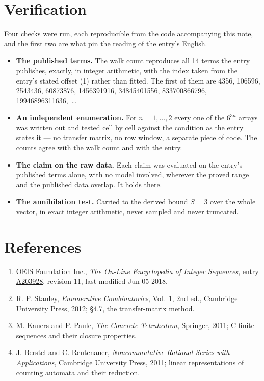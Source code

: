\documentclass[11pt]{article}
\theoremstyle{definition}
\begin{document}
\section{Verification}

Four checks were run, each reproducible from the code accompanying this note, and the first two are what pin the reading of the entry's English.

\begin{itemize}

\item {\bfseries The published terms.} The walk count reproduces all 14 terms the entry publishes, exactly, in integer arithmetic, with the index taken from the entry's stated offset (1) rather than fitted. The first of them are 4356, 106596, 2543436, 60873876, 1456391916, 34845401556, 833700866796, 19946896311636,~\dots

\item {\bfseries An independent enumeration.} For $n = 1,\dots,2$ every one of the $6^{3n}$ arrays was written out and tested cell by cell against the condition as the entry states it --- no transfer matrix, no row window, a separate piece of code. The counts agree with the walk count and with the entry.

\item {\bfseries The claim on the raw data.} Each claim was evaluated on the entry's published terms alone, with no model involved, wherever the proved range and the published data overlap. It holds there.

\item {\bfseries The annihilation test.} Carried to the derived bound $S = 3$ over the whole vector, in exact integer arithmetic, never sampled and never truncated.

\end{itemize}

\section{References}

\begin{enumerate}

\item OEIS Foundation Inc., \emph{The On-Line Encyclopedia of Integer Sequences}, entry \href{https://oeis.org/A203928}{A203928}, revision 11, last modified Jun 05 2018.

\item R. P. Stanley, \emph{Enumerative Combinatorics}, Vol.~1, 2nd ed., Cambridge University Press, 2012; \S4.7, the transfer-matrix method.

\item M. Kauers and P. Paule, \emph{The Concrete Tetrahedron}, Springer, 2011; C-finite sequences and their closure properties.

\item J. Berstel and C. Reutenauer, \emph{Noncommutative Rational Series with Applications}, Cambridge University Press, 2011; linear representations of counting automata and their reduction.

\end{enumerate}
\end{document}
